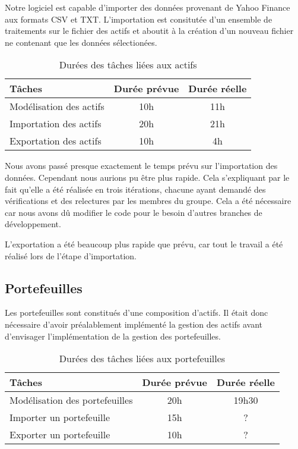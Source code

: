 \documentclass[a4paper]{report}
\begin{document}
Notre logiciel est capable d'importer des données provenant de Yahoo Finance aux formats CSV et TXT.
L'importation est consitutée d'un ensemble de traitements sur le fichier des actifs et aboutit à la création d'un nouveau fichier ne contenant que les données sélectionées.

\begin{table}[H]
\centering
  \begin{tabularx}{0.8\textwidth}{| X | c | c |}
    \hline
	Tâches & Durée prévue & Durée réelle\\
    \hline
    Modélisation des actifs & 10h & 11h\\
    Importation des actifs & 20h & 21h\\
    Exportation des actifs & 10h & 4h\\
    \hline
  \end{tabularx}
  \caption{Durées des tâches liées aux actifs}
\end{table}

Nous avons passé presque exactement le temps prévu sur l'importation des données.
Cependant nous aurions pu être plus rapide.
Cela s'expliquant par le fait qu'elle a été réalisée en trois itérations, chacune ayant demandé des vérifications et des relectures par les membres du groupe.
Cela a été nécessaire car nous avons dû modifier le code pour le besoin d'autres branches de développement.

L'exportation a été beaucoup plus rapide que prévu, car tout le travail a été réalisé lors de l'étape d'importation.

\subsection{Portefeuilles}
Les portefeuilles sont constitués d'une composition d'actifs.
Il était donc nécessaire d'avoir préalablement implémenté la gestion des actifs avant d'envisager l'implémentation de la gestion des portefeuilles.

\begin{table}[H]
\centering
  \begin{tabularx}{0.8\textwidth}{| X | c | c |}
    \hline
	Tâches & Durée prévue & Durée réelle \\
    \hline
     Modélisation des portefeuilles &  20h & 19h30\\
     Importer un portefeuille &  15h & ?\\
     Exporter un portefeuille &  10h & ?\\
    \hline
  \end{tabularx}
  \caption{Durées des tâches liées aux portefeuilles}
\end{table}
\end{document}
